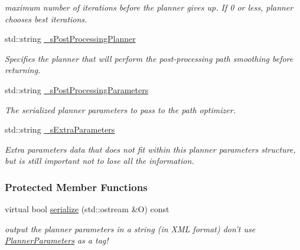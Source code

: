 \begin{DoxyCompactItemize}
\begin{DoxyCompactList}\small\item\em maximum number of iterations before the planner gives up. If 0 or less, planner chooses best iterations. \item\end{DoxyCompactList}\item 
std::string \hyperlink{classOpenRAVE_1_1PlannerBase_1_1PlannerParameters_aece70c470f96fbe3cd74ce45ee0145b0}{\_\-sPostProcessingPlanner}
\begin{DoxyCompactList}\small\item\em Specifies the planner that will perform the post-\/processing path smoothing before returning. \item\end{DoxyCompactList}\item 
std::string \hyperlink{classOpenRAVE_1_1PlannerBase_1_1PlannerParameters_a0f1a23c0726e36b98edbe514d4962d08}{\_\-sPostProcessingParameters}
\begin{DoxyCompactList}\small\item\em The serialized planner parameters to pass to the path optimizer. \item\end{DoxyCompactList}\item 
\hypertarget{classOpenRAVE_1_1PlannerBase_1_1PlannerParameters_a05c2cb3cd9524fb2b1883a7639801084}{
std::string \hyperlink{classOpenRAVE_1_1PlannerBase_1_1PlannerParameters_a05c2cb3cd9524fb2b1883a7639801084}{\_\-sExtraParameters}}
\label{classOpenRAVE_1_1PlannerBase_1_1PlannerParameters_a05c2cb3cd9524fb2b1883a7639801084}

\begin{DoxyCompactList}\small\item\em Extra parameters data that does not fit within this planner parameters structure, but is still important not to lose all the information. \item\end{DoxyCompactList}\end{DoxyCompactItemize}
\subsubsection*{Protected Member Functions}
\begin{DoxyCompactItemize}
\item 
\hypertarget{classOpenRAVE_1_1PlannerBase_1_1PlannerParameters_a2084222cd1b9f555406d306d65680d7b}{
virtual bool \hyperlink{classOpenRAVE_1_1PlannerBase_1_1PlannerParameters_a2084222cd1b9f555406d306d65680d7b}{serialize} (std::ostream \&O) const }
\label{classOpenRAVE_1_1PlannerBase_1_1PlannerParameters_a2084222cd1b9f555406d306d65680d7b}

\begin{DoxyCompactList}\small\item\em output the planner parameters in a string (in XML format) don't use \hyperlink{classOpenRAVE_1_1PlannerBase_1_1PlannerParameters}{PlannerParameters} as a tag! \item\end{DoxyCompactList}\end{DoxyCompactItemize}
